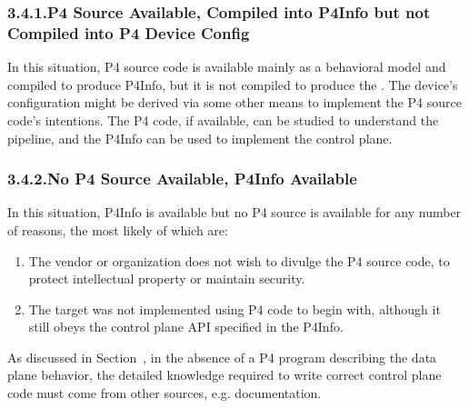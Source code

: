 \documentclass[11pt]{article}
\begin{document}
{%
\subsubsection{3.4.1.\hspace*{0.5em}P4 Source Available, Compiled into P4Info but not Compiled into P4 Device Config}\label{sec-p4-source-available-compiled-into-p4info-but-not-compiled-into-p4-device-config}%

\noindent{}In this situation, P4 source code is available mainly as a behavioral model and
compiled to produce P4Info, but it is not compiled to produce the
. The device's configuration might be derived via some other
means to implement the P4 source code's intentions. The P4 code, if available,
can be studied to understand the pipeline, and the P4Info can be used to
implement the control plane.%

\subsubsection{3.4.2.\hspace*{0.5em}No P4 Source Available, P4Info Available}\label{sec-no-p4-source-available-p4info-available}%

\noindent{}In this situation, P4Info is available but no P4 source is available for any
number of reasons, the most likely of which are:%

\begin{enumerate}%

\item{}
The vendor or organization does not wish to divulge the P4 source code, to
protect intellectual property or maintain security.%

\item{}
The target was not implemented using P4 code to begin with, although it still
obeys the control plane API specified in the P4Info.%
\end{enumerate}%

\noindent{}As discussed in Section~, in the
absence of a P4 program describing the data plane behavior, the detailed
knowledge required to write correct control plane code must come from other
sources, e.g. documentation.%

}
\end{document}

